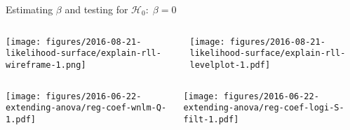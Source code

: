 \documentclass{beamer}
\newcommand{\ownfigscale}[0]{0.4}
\begin{document}
\begin{frame}{Estimating \(\beta\) and testing for \(\mathcal{H}_0:\;\beta=0\)}
\begin{columns}[t]
\begin{column}{0.5\textwidth}

\texttt{[image: figures/2016-08-21-likelihood-surface/explain-rll-wireframe-1.png]}
\end{column}

\begin{column}{0.5\textwidth}

\texttt{[image: figures/2016-08-21-likelihood-surface/explain-rll-levelplot-1.pdf]}
\end{column}
\end{columns}
\end{frame}

\begin{frame}[plain, label=all-betas]
\begin{columns}[t]
\begin{column}{0.5\textwidth}

\texttt{[image: figures/2016-06-22-extending-anova/reg-coef-wnlm-Q-1.pdf]}
\end{column}

\begin{column}{0.5\textwidth}

\texttt{[image: figures/2016-06-22-extending-anova/reg-coef-logi-S-filt-1.pdf]}
\end{column}
\end{columns}
\end{frame}
\end{document}

